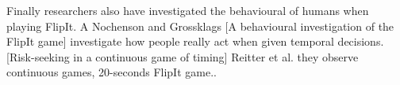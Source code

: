 Finally researchers also have investigated the behavioural of humans when playing FlipIt. A Nochenson and Grossklags [A behavioural investigation of the FlipIt game]  investigate how people really act when given temporal decisions. [Risk-seeking in a continuous game of timing] Reitter et al. they observe continuous games, 20-seconds FlipIt game..




